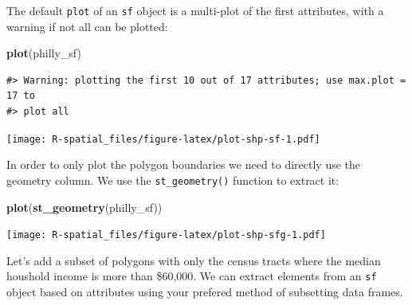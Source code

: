 \documentclass[]{book}
\newenvironment{Shaded}{\begin{snugshade}}{\end{snugshade}}
\newcommand{\KeywordTok}[1]{\textcolor[rgb]{0.13,0.29,0.53}{\textbf{#1}}}
\newcommand{\DataTypeTok}[1]{\textcolor[rgb]{0.13,0.29,0.53}{#1}}
\newcommand{\DecValTok}[1]{\textcolor[rgb]{0.00,0.00,0.81}{#1}}
\newcommand{\StringTok}[1]{\textcolor[rgb]{0.31,0.60,0.02}{#1}}
\newcommand{\CommentTok}[1]{\textcolor[rgb]{0.56,0.35,0.01}{\textit{#1}}}
\newcommand{\OperatorTok}[1]{\textcolor[rgb]{0.81,0.36,0.00}{\textbf{#1}}}
\newcommand{\NormalTok}[1]{#1}
\begin{document}
The default \texttt{plot} of an \texttt{sf} object is a multi-plot of
the first attributes, with a warning if not all can be plotted:

\begin{Shaded}
\begin{Highlighting}[]
\KeywordTok{plot}\NormalTok{(philly_sf)}
\end{Highlighting}
\end{Shaded}

\begin{verbatim}
#> Warning: plotting the first 10 out of 17 attributes; use max.plot = 17 to
#> plot all
\end{verbatim}

\texttt{[image: R-spatial\_files/figure-latex/plot-shp-sf-1.pdf]}

In order to only plot the polygon boundaries we need to directly use the
geometry column. We use the \texttt{st\_geometry()} function to extract
it:

\begin{Shaded}
\begin{Highlighting}[]
\KeywordTok{plot}\NormalTok{(}\KeywordTok{st_geometry}\NormalTok{(philly_sf))}
\end{Highlighting}
\end{Shaded}

\texttt{[image: R-spatial\_files/figure-latex/plot-shp-sfg-1.pdf]}

Let's add a subset of polygons with only the census tracts where the
median houshold income is more than \$60,000. We can extract elements
from an \texttt{sf} object based on attributes using your prefered
method of subsetting data frames.

\begin{Shaded}
\end{Shaded}
\end{document}
